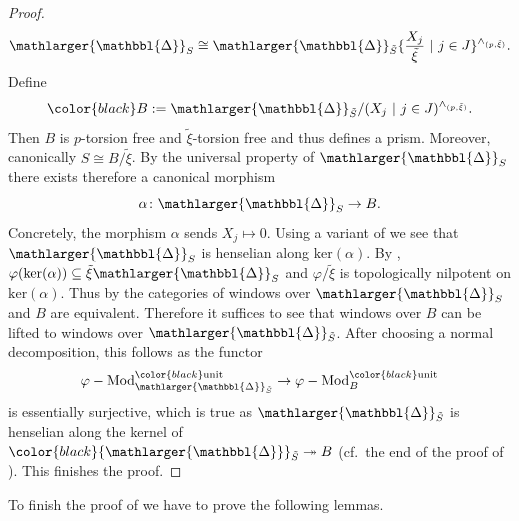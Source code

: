 \documentclass{amsart}
\newcommand{\prism}{{\mathlarger{\mathbbl{\Delta}}}}
\theoremstyle{plain}
\theoremstyle{definition}
\newcommand{\tilxi}{\tilde{\xi}}
\newcommand{\red}[1]{{\color{black} #1}}
\newcommand{\blue}[1]{{\color{black}#1}}
\begin{document}
\begin{proof}
  $$
  \prism_{S}\cong \prism_{\tilde{S}}\{\frac{X_j}{\tilxi}\ |\ j\in J\}^{\wedge_{(p,\tilxi)}}.
  $$
  Define
  $$
  \blue{B:=\prism_{\tilde{S}}/(X_j\ |\ j\in J)^{\wedge_{(p,\tilxi)}}}.
  $$
  Then $B$ is $p$-torsion free and $\tilxi$-torsion free and thus
  defines a prism. Moreover, canonically $S\cong B/\tilxi$. By the
  universal property of $\prism_S$ there exists therefore a canonical
  morphism
  $$
  \alpha\colon \prism_{S}\to B.
  $$
  Concretely, the morphism $\alpha$ sends $X_j\mapsto 0$. Using a
  variant of
   we
  see that $\prism_S$ is henselian along
  $\mathrm{ker}(\alpha)$. By
    ,
    $\varphi(\ker(\alpha))\subseteq \tilxi\prism_S$ and
    $\varphi/\tilxi$ is topologically nilpotent on
    $\mathrm{ker}(\alpha)$. Thus by
   the
  categories of windows over $\prism_S$ and $B$ are
  equivalent. Therefore it suffices to see that windows over $B$ can
  be lifted to windows over $\prism_{\tilde{S}}$. After choosing a
  normal decomposition, this follows as the functor
  $$
\varphi-\mathrm{Mod}_{\prism_{\tilde{S}}}^{\red{\mathrm{unit}}}\to \varphi-\mathrm{Mod}_B^{\red{\mathrm{unit}}} 
$$
is essentially surjective, which is true as \red{$\prism_{\tilde{S}}$} is henselian
along the kernel of $\red{\prism_{\tilde{S}}}\twoheadrightarrow B$ (cf.\ the end of
the proof of
). This
finishes the proof.
\end{proof}

To finish the proof of
   we have to prove the following lemmas.
\end{document}
